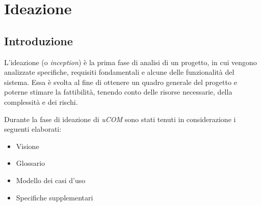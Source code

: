 \section{Ideazione}

\subsection{Introduzione}

L'ideazione (o \textit{inception}) è la prima fase di analisi di un progetto, in cui vengono analizzate specifiche, requisiti fondamentali e alcune delle funzionalità del sistema.
Essa è svolta al fine di ottenere un quadro generale del progetto e poterne stimare la fattibilità, tenendo conto delle risorse necessarie, della complessità e dei rischi. 

Durante la fase di ideazione di \textit{uCOM} sono stati tenuti in considerazione i seguenti elaborati:
\begin{itemize}
	\item Visione
	\item Glossario
	\item Modello dei casi d'uso
	\item Specifiche supplementari
\end{itemize}



